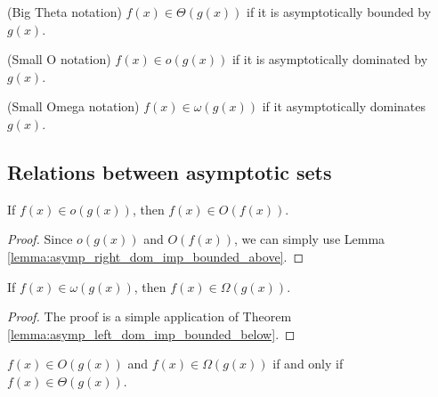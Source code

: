 \begin{definition}(Big Theta notation)
    \label{def:big_theta}
    \leanok
    $f(x) \in \Theta(g(x))$ if it is asymptotically bounded by $g(x)$. 
\end{definition}

\begin{definition}(Small O notation)
    \label{def:small_o}
    \leanok
    $f(x) \in o(g(x))$ if it is asymptotically dominated by $g(x)$.
\end{definition}

\begin{definition}(Small Omega notation)
    \label{def:small_omega}
    \leanok
    $f(x) \in \omega(g(x))$ if it asymptotically dominates $g(x)$.
\end{definition}


\subsection{Relations between asymptotic sets}

\begin{lemma}
    \label{lemma:small_o_imp_big_o}
    \leanok
    If $f(x) \in o(g(x))$, then $f(x) \in O(f(x))$.
\end{lemma}

\begin{proof}
    \leanok
    Since $o(g(x))$ and $O(f(x))$, we can simply use Lemma 
    \ref{lemma:asymp_right_dom_imp_bounded_above}.
\end{proof}

\begin{theorem}
    \label{thm:small_omega_imp_big_omega}
    \leanok
    If $f(x) \in \omega(g(x))$, then $f(x) \in \Omega(g(x))$.
\end{theorem}

\begin{proof}
    \leanok
    The proof is a simple application of Theorem 
    \ref{lemma:asymp_left_dom_imp_bounded_below}.
\end{proof}

\begin{theorem}
    \label{thm:big_o_and_omega_iff_theta}
    \leanok
    $f(x) \in O(g(x))$ and $f(x) \in \Omega(g(x))$ if and only if $f(x) \in \Theta(g(x))$.
\end{theorem}

